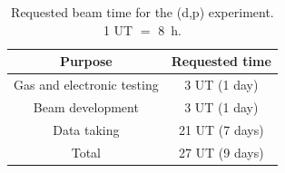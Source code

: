 \documentclass[a4paper, 10pt]{article}
\newcommand{\iso}[2]{\ce{^{#1}#2}}
\begin{document}
\begin{table}[!htbp]
\begin{minipage}[t]{0.56\linewidth}
        \label{tab:stats}
    \end{minipage}\hfill
    \begin{minipage}[t]{0.4\linewidth}
        \centering
        \begin{tabular}{@{}cc@{}}
            \toprule
            Purpose     & Requested time            \\ \midrule
            Gas and electronic testing & 3 UT (1 day)   \\
            Beam development & 3 UT (1 day)   \\
            Data taking & 21 UT (7 days)            \\ \midrule
            Total       & 27 UT (9 days)            \\ \bottomrule
        \end{tabular}
        \caption{Requested beam time for the \iso{17}{C}(d,p)\iso{18}{C} experiment. 1 UT $=$ \qty{8}{\hour}.}
        \label{tab:request}
    \end{minipage}
\end{table}
\end{document}
